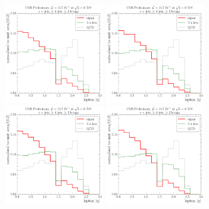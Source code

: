 \begin{figure}[!htbp]
  \centering
    \hspace*{\fill}
    {\includegraphics[width=0.39\textwidth]{measurement/MT/central/fit_templates/electron_templates_bin_0-30}}\hfill
    {\includegraphics[width=0.39\textwidth]{measurement/MT/central/fit_templates/electron_templates_bin_30-50}}
    \hspace*{\fill} \\
    \hspace*{\fill}
    {\includegraphics[width=0.39\textwidth]{measurement/MT/central/fit_templates/electron_templates_bin_50-80}}\hfill
    {\includegraphics[width=0.39\textwidth]{measurement/MT/central/fit_templates/electron_templates_bin_80-100}}

\end{figure}
